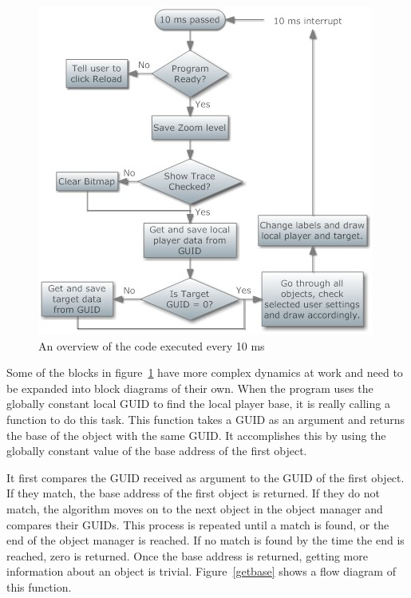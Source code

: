\begin{figure}[htbp]  
\centering
\includegraphics[scale = 0.65]{10ms.jpg}	
\caption{An overview of the code executed every 10 ms}
\label{10ms}
\end{figure}

Some of the blocks in figure~\ref{10ms} have more complex dynamics at work and need to be expanded into block diagrams of their own. When the program uses the globally constant local GUID to find the local player base, it is really calling a function to do this task. This function takes a GUID as an argument and returns the base of the object with the same GUID. It accomplishes this by using the globally constant value of the base address of the first object. 

It first compares the GUID received as argument to the GUID of the first object. If they match, the base address of the first object is returned. If they do not match, the algorithm moves on to the next object in the object manager and compares their GUIDs. This process is repeated until a match is found, or the end of the object manager is reached. If no match is found by the time the end is reached, zero is returned. Once the base address is returned, getting more information about an object is trivial. Figure~\ref{getbase} shows a flow diagram of this function.


